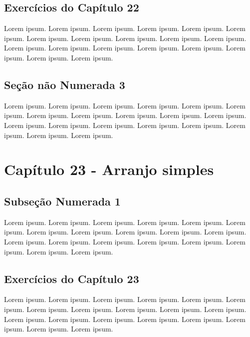 \documentclass[
]{book}
\begin{document}
\hypertarget{exercuxedcios-do-capuxedtulo-22}{%
\subsection{Exercícios do Capítulo 22}\label{exercuxedcios-do-capuxedtulo-22}}

Lorem ipsum. Lorem ipsum. Lorem ipsum. Lorem ipsum. Lorem ipsum. Lorem ipsum. Lorem ipsum. Lorem ipsum. Lorem ipsum. Lorem ipsum. Lorem ipsum. Lorem ipsum. Lorem ipsum. Lorem ipsum. Lorem ipsum. Lorem ipsum. Lorem ipsum. Lorem ipsum. Lorem ipsum.

\hypertarget{seuxe7uxe3o-nuxe3o-numerada-3}{%
\subsection*{Seção não Numerada 3}\label{seuxe7uxe3o-nuxe3o-numerada-3}}

Lorem ipsum. Lorem ipsum. Lorem ipsum. Lorem ipsum. Lorem ipsum. Lorem ipsum. Lorem ipsum. Lorem ipsum. Lorem ipsum. Lorem ipsum. Lorem ipsum. Lorem ipsum. Lorem ipsum. Lorem ipsum. Lorem ipsum. Lorem ipsum. Lorem ipsum. Lorem ipsum. Lorem ipsum.

\hypertarget{capuxedtulo-23---arranjo-simples}{%
\section{Capítulo 23 - Arranjo simples}\label{capuxedtulo-23---arranjo-simples}}

\hypertarget{subseuxe7uxe3o-numerada-1-1}{%
\subsection{Subseção Numerada 1}\label{subseuxe7uxe3o-numerada-1-1}}

Lorem ipsum. Lorem ipsum. Lorem ipsum. Lorem ipsum. Lorem ipsum. Lorem ipsum. Lorem ipsum. Lorem ipsum. Lorem ipsum. Lorem ipsum. Lorem ipsum. Lorem ipsum. Lorem ipsum. Lorem ipsum. Lorem ipsum. Lorem ipsum. Lorem ipsum. Lorem ipsum. Lorem ipsum.

\hypertarget{exercuxedcios-do-capuxedtulo-23}{%
\subsection{Exercícios do Capítulo 23}\label{exercuxedcios-do-capuxedtulo-23}}

Lorem ipsum. Lorem ipsum. Lorem ipsum. Lorem ipsum. Lorem ipsum. Lorem ipsum. Lorem ipsum. Lorem ipsum. Lorem ipsum. Lorem ipsum. Lorem ipsum. Lorem ipsum. Lorem ipsum. Lorem ipsum. Lorem ipsum. Lorem ipsum. Lorem ipsum. Lorem ipsum. Lorem ipsum.
\end{document}
